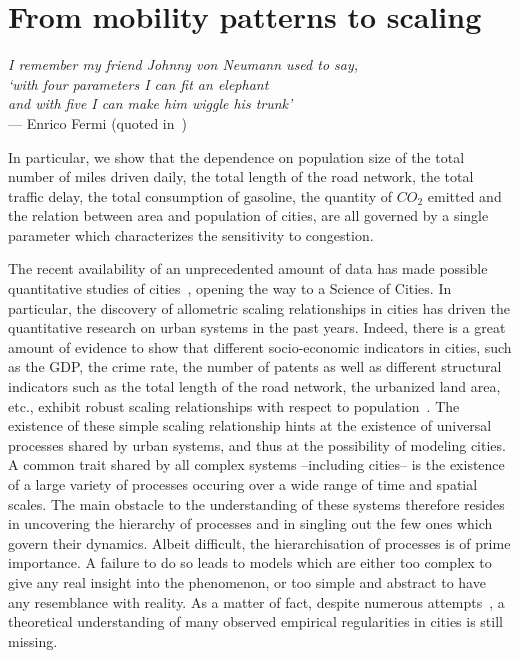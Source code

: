 %
\chapter{From mobility patterns to scaling}
\label{chap:scaling_model}

\begin{flushright}{\slshape    
I remember my friend Johnny von Neumann used to say,\\
`with four parameters I can fit an elephant\\
and with five I can make him wiggle his trunk'} \\ \medskip
--- Enrico Fermi (quoted in~\cite{Dyson:2004})
\end{flushright}

\bigskip

In particular, we show that the dependence on population size of the total
number of miles driven daily, the total length of the road network, the total
traffic delay, the total consumption of gasoline, the quantity of $CO_2$ emitted
and the relation between area and population of cities, are all governed by a
single parameter which characterizes the sensitivity to congestion. 


The recent availability of an unprecedented amount of data has made possible
quantitative studies of cities~\cite{Fujita:1999,Batty:2007,Marshall:2004},
opening the way to a Science of Cities. In particular, the discovery of
allometric scaling relationships in cities has driven the quantitative research
on urban systems in the past years. Indeed, there is a great amount of evidence
to show that different socio-economic indicators in cities, such as the GDP, the
crime rate, the number of patents as well as different structural indicators
such as the total length of the road network, the urbanized land area, etc.,
exhibit robust scaling relationships with respect to
population~\cite{Newman:1989,Makse:1995,Pumain:2006,Bettencourt:2007,Samaniego:2008,Rozenfeld:2008,Pan:2013}.
The existence of these simple scaling relationship hints at the existence of
universal processes shared by urban systems, and thus at the possibility of
modeling cities.\\

A common trait shared by all complex systems --including cities-- is the
existence of a large variety of processes occuring over a wide range of time and
spatial scales. The main obstacle to the understanding of these systems
therefore resides in uncovering the hierarchy of processes and in singling out
the few ones which govern their dynamics. Albeit difficult, the hierarchisation
of processes is of prime importance. A failure to do so leads to models which
are  either too complex to give any real insight into the phenomenon, or too
simple and abstract to have any resemblance with reality. As a matter of fact,
despite numerous
attempts~\cite{Fujita:1982,Makse:1995,Batty:2008,Frasco:2013,Bettencourt:2010,Bettencourt:2013},
a theoretical understanding of many observed empirical regularities in cities is
still missing.\\

